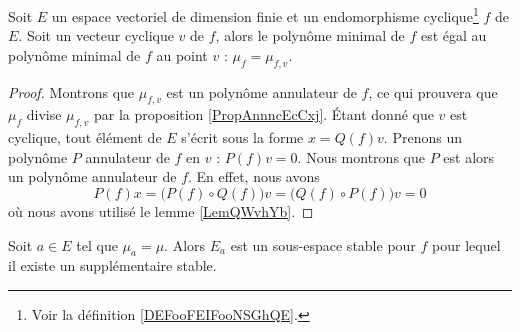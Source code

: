\begin{lemma}   \label{LemAGZNNa}
    Soit \( E\) un espace vectoriel de dimension finie et un endomorphisme cyclique\footnote{Voir la définition \ref{DEFooFEIFooNSGhQE}.} \( f\) de \( E\). Soit un vecteur cyclique \( v\) de \( f\), alors le polynôme minimal de \( f\) est égal au polynôme minimal de \( f\) au point \( v\) : \( \mu_{f}=\mu_{f,v}\).
\end{lemma}

\begin{proof}
    Montrons que \( \mu_{f,v}\) est un polynôme annulateur de \( f\), ce qui prouvera que \( \mu_f\) divise \( \mu_{f,v}\) par la proposition \ref{PropAnnncEcCxj}. Étant donné que \( v\) est cyclique, tout élément de \( E\) s'écrit sous la forme \( x=Q(f)v\). Prenons un polynôme \( P\) annulateur de \( f\) en \( v\) : \( P(f)v=0\). Nous montrons que \( P\) est alors un polynôme annulateur de \( f\). En effet, nous avons
    \begin{equation}
        P(f)x=\big( P(f)\circ Q(f) \big)v=\big( Q(f)\circ P(f) \big)v=0
    \end{equation}
    où nous avons utilisé le lemme \ref{LemQWvhYb}.
\end{proof}

\begin{lemma}
    Soit \( a\in E\) tel que \( \mu_a=\mu\). Alors \( E_a\) est un sous-espace stable pour \( f\) pour lequel il existe un supplémentaire stable.
\end{lemma}

